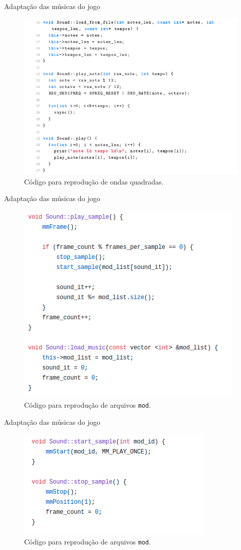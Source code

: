 \documentclass[notes, mathserif]{beamer}
\begin{document}
\begin{frame}{Adapta\c c\~ao das m\'usicas do jogo}
	\begin{figure}[H]
		\includegraphics[width=.7\linewidth]{figuras/sound-1.png}
		\centering
		\caption{C\'odigo para reprodu\c c\~ao de ondas quadradas.}
		\label{fig:vsync}
	\end{figure}
\end{frame}

\begin{frame}{Adapta\c c\~ao das m\'usicas do jogo}
	\begin{figure}[H]
		\includegraphics[width=.6\linewidth]{figuras/sound-2.png}
		\centering
		\caption{C\'odigo para reprodu\c c\~ao de arquivos \texttt{mod}.}
		\label{fig:vsync}
	\end{figure}
\end{frame}

\begin{frame}{Adapta\c c\~ao das m\'usicas do jogo}
	\begin{figure}[H]
		\includegraphics[width=.7\linewidth]{figuras/sound-3.png}
		\centering
		\caption{C\'odigo para reprodu\c c\~ao de arquivos \texttt{mod}.}
		\label{fig:vsync}
	\end{figure}
\end{frame}
\end{document}

